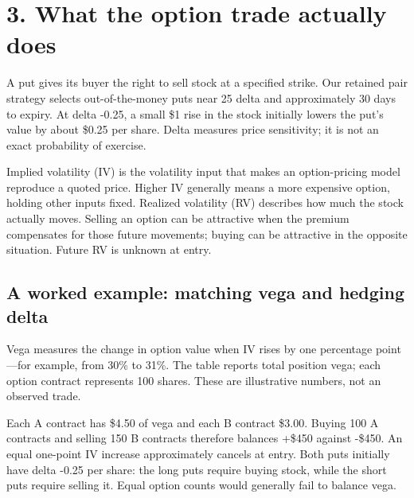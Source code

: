 \documentclass[11pt,letterpaper]{article}
\begin{document}
\clearpage
\section*{3. What the option trade actually does}
A put gives its buyer the right to sell stock at a specified strike. Our retained pair strategy selects out-of-the-money puts near 25 delta and approximately 30 days to expiry. At delta -0.25, a small \$1 rise in the stock initially lowers the put's value by about \$0.25 per share. Delta measures price sensitivity; it is not an exact probability of exercise.

Implied volatility (IV) is the volatility input that makes an option-pricing model reproduce a quoted price. Higher IV generally means a more expensive option, holding other inputs fixed. Realized volatility (RV) describes how much the stock actually moves. Selling an option can be attractive when the premium compensates for those future movements; buying can be attractive in the opposite situation. Future RV is unknown at entry.

\subsection*{A worked example: matching vega and hedging delta}
Vega measures the change in option value when IV rises by one percentage point---for example, from 30\% to 31\%. The table reports total position vega; each option contract represents 100 shares. These are illustrative numbers, not an observed trade.

\begin{center}\small{}\end{center}
Each A contract has \$4.50 of vega and each B contract \$3.00. Buying 100 A contracts and selling 150 B contracts therefore balances +\$450 against -\$450. An equal one-point IV increase approximately cancels at entry. Both puts initially have delta -0.25 per share: the long puts require buying stock, while the short puts require selling it. Equal option counts would generally fail to balance vega.
\end{document}
